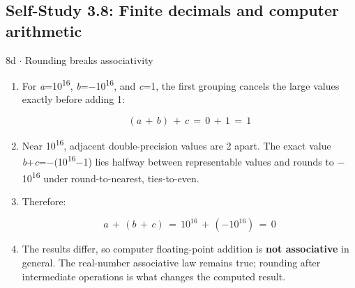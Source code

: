 \documentclass[11pt]{article}
\begin{document}
\begin{keepsection}\subsection{Self-Study 3.8: Finite decimals and computer arithmetic}

\begin{workedbox}{8d \ensuremath{\cdot} Rounding breaks associativity}
\begin{enumerate}
\item {}
For \textit{a}=10\textsuperscript{16}, \textit{b}=\ensuremath{-}10\textsuperscript{16}, and \textit{c}=1, the first grouping cancels the large values exactly before adding 1:

\begin{equation*}({a}\, +\, {b})\, +\, {c}\, =\, 0\, +\, 1\, =\, 1\end{equation*}
\item Near 10\textsuperscript{16}, adjacent double-precision values are 2 apart. The exact value \textit{b}+\textit{c}=\ensuremath{-}(10\textsuperscript{16}\ensuremath{-}1) lies halfway between representable values and rounds to \ensuremath{-}10\textsuperscript{16} under round-to-nearest, ties-to-even.
\item {}
Therefore:

\begin{equation*}{a}\, +\, ({b}\, +\, {c})\, =\, 10^{16}\, +\, (-10^{16})\, =\, 0\end{equation*}
\item The results differ, so computer floating-point addition is \textbf{not associative} in general. The real-number associative law remains true; rounding after intermediate operations is what changes the computed result.
\end{enumerate}
\end{workedbox}

\end{keepsection}
\end{document}
